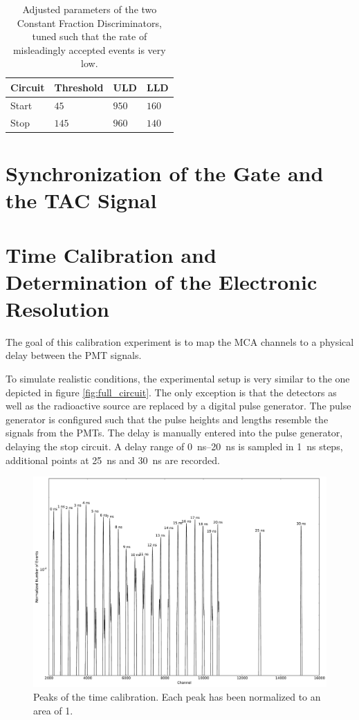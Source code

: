 \documentclass[
	paper=A4,
	parskip=full,
	chapterprefix=true,
	11pt,
	headings=normal,
	bibliography=totoc,
	listof=totoc,
	titlepage=on,
]{scrreprt}
\begin{document}
\begin{table}[htbp]
	\centering
	\begin{tabular}{ 
			l
			l
			l
			l
		}
		\toprule
		{Circuit} & {Threshold} & {ULD} & {LLD} \\ 
		\midrule
		Start & $45$ & $950$ & $160$ \\
		Stop & $145$ & $960$ & $140$ \\
		\bottomrule
	\end{tabular}
	\caption{Adjusted parameters of the two Constant Fraction Discriminators, tuned such that the rate of misleadingly accepted events is very low.}
	\label{tbl:CFD_values}
\end{table}



\section{Synchronization of the Gate and the TAC Signal}

\section{Time Calibration and Determination of the Electronic Resolution}
The goal of this calibration experiment is to map the MCA channels to a physical delay between the PMT signals. 

To simulate realistic conditions, the experimental setup is very similar to the one depicted in figure \ref{fig:full_circuit}. The only  exception is that the detectors as well as the radioactive source are replaced by a digital pulse generator. The pulse generator is configured such that the pulse heights and lengths resemble the signals from the PMTs.  
The delay is manually entered into the pulse generator, delaying the stop circuit. A delay range of \SIrange{0}{20}{\nano\second} is sampled in \SI{1}{\nano\second} steps, additional points at \SI{25}{\nano\second} and \SI{30}{\nano\second} are recorded.

\begin{figure}
	\centering
	\includegraphics{calibration_peaks}
	\caption{Peaks of the time calibration. Each peak has been normalized to an area of \num{1}.}
	\label{fig:calibration_raw}
\end{figure}
\end{document}
